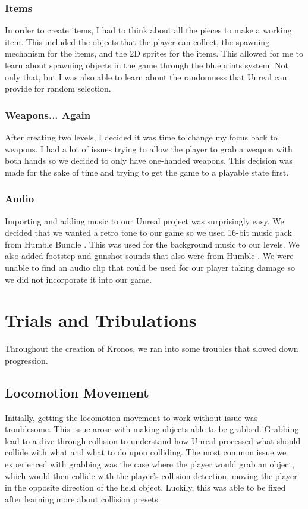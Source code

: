 \documentclass{sigchi}
\begin{document}
\subsubsection*{Items} In order to create items, I had to think about all the pieces to make a working item. This included the objects that the player can collect, the spawning mechanism for the items, and the 2D sprites for the items. This allowed for me to learn about spawning objects in the game through the blueprints system. Not only that, but I was also able to learn about the randomness that Unreal can provide for random selection.

\subsubsection*{Weapons... Again}
After creating two levels, I decided it was time to change my focus back to weapons. I had a lot of issues trying to allow the player to grab a weapon with both hands so we decided to only have one-handed weapons. This decision was made for the sake of time and trying to get the game to a playable state first.

\subsubsection*{Audio}
Importing and adding music to our Unreal project was surprisingly easy. We decided that we wanted a retro tone to our game so we used 16-bit music pack from Humble Bundle \cite{humble}. This was used for the background music to our levels. We also added footstep and gunshot sounds that also were from Humble \cite{humble}. We were unable to find an audio clip that could be used for our player taking damage so we did not incorporate it into our game. 

\section{Trials and Tribulations}
Throughout the creation of Kronos, we ran into some troubles that slowed down progression. 
\subsection*{Locomotion Movement}
Initially, getting the locomotion movement to work without issue was troublesome. This issue arose with making objects able to be grabbed. Grabbing lead to a dive through collision to understand how Unreal processed what should collide with what and what to do upon colliding. The most common issue we experienced with grabbing was the case where the player would grab an object, which would then collide with the player's collision detection, moving the player in the opposite direction of the held object. Luckily, this was able to be fixed after learning more about collision presets.
\end{document}
